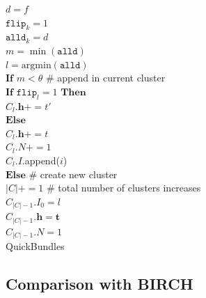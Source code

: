 \documentclass[preprint,authoryear,a4paper,10pt,onecolumn]{elsarticle}
\begin{document}
\begin{appendices}
\begin{algorithm}
\hspace*{6em} $d = f$\\
\hspace*{6em} $\texttt{flip}_{k} = 1$\\
\hspace*{4em} $\texttt{alld}_{k} = d$\\
$m=\min(\texttt{alld})$\\
$l=\mathrm{arg min}(\texttt{alld})$\\
$\textbf{If}$ $m < \theta$ \# append in current cluster \\
\hspace*{2em} $\textbf{If}$ $\texttt{flip}_{l}=1$ $\textbf{Then}$\\
\hspace*{4em} $C_{l}.\mathbf{h}+=t'$\\
\hspace*{2em} $\textbf{Else}$ \\
\hspace*{4em} $C_{l}.\mathbf{h}+=t$\\
\hspace*{2em} $C_{l}.N+=1$\\
\hspace*{2em} $C_{l}.I$.append($i$)\\
$\textbf{Else}$ \# create new cluster\\
\hspace*{2em} $|C|+=1$ \# total number of clusters increases\\
\hspace*{2em} $C_{|C|-1}.I_{0}=l$\\
\hspace*{2em} $C_{|C|-1}.\mathbf{h}=\mathbf{t}$\\
\hspace*{2em} $C_{|C|-1}.N=1$\\
\caption{QuickBundles\label{Alg:QuickBundles}}
\end{algorithm}

\subsection{Comparison with BIRCH\label{sub:BIRCH}}



\end{appendices}
\end{document}
